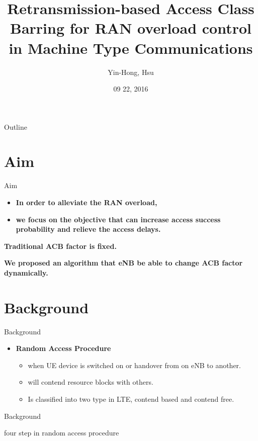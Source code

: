 \documentclass{beamer}
\title {
    Retransmission-based Access Class Barring for RAN overload control in Machine Type Communications
}
\author {
    Yin-Hong, Hsu
}
\date {
    09 22, 2016
}
\begin{document}
\begin{frame}
    \titlepage
\end{frame}


\begin{frame}{Outline}
    \tableofcontentsgather
    \tableofcontents
\end{frame}

\section{Aim}

\begin{frame}{Aim} 
    \begin{itemize}
        \item \textbf{In order to alleviate the RAN overload,}
    \end{itemize}

    \begin{itemize}
        \item \textbf{we focus on the objective that can increase access success probability and relieve the access delays.}
    \end{itemize}
    \item \textbf{Traditional ACB factor is fixed.}
    \item \textbf{We proposed an algorithm that eNB be able to change ACB factor dynamically.} 

\end{frame}

\section{Background}
\begin{frame}{Background}
\begin{itemize}
    \item \textbf{Random Access Procedure}
    \begin{itemize}
        \item {when UE device is switched on or handover from on eNB to another.}
        \item{will contend resource blocks with others.}
        \item{Is classified into two type in LTE, contend based and contend free.}
    \end{itemize}
\end{itemize}

\end{frame}
\begin{frame}{Background}
    \item{four step in random access procedure}
\end{frame}
\end{document}
